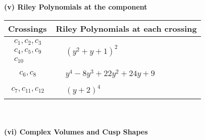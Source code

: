 \documentclass[1p]{elsarticle_modified}
\theoremstyle{definition}
\begin{document}
\newpage\renewcommand{\arraystretch}{1}
\flushleft \textbf{(v) Riley Polynomials at the component}\newline \\
\begin{tabular}{m{50pt}|m{274pt}}
Crossings & \hspace{64pt}Riley Polynomials at each crossing \\
\hline $$\begin{aligned}c_{1},c_{2},c_{3}\\c_{4},c_{5},c_{9}\\c_{10}\end{aligned}$$&$\begin{aligned}
&(y^2+y+1)^2
\end{aligned}$\\
\hline $$\begin{aligned}c_{6},c_{8}\end{aligned}$$&$\begin{aligned}
&y^4-8 y^3+22 y^2+24 y+9
\end{aligned}$\\
\hline $$\begin{aligned}c_{7},c_{11},c_{12}\end{aligned}$$&$\begin{aligned}
&(y+2)^4
\end{aligned}$\\
\hline
\end{tabular}\\~\\
\newpage\flushleft \textbf{(vi) Complex Volumes and Cusp Shapes}
\end{document}
